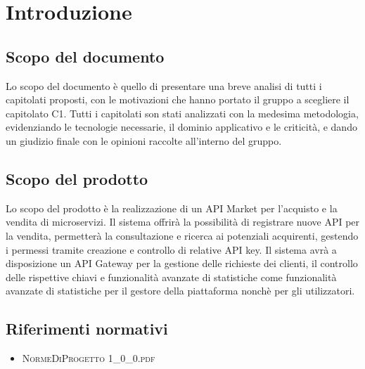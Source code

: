 \newpage
\section{Introduzione}
\subsection{Scopo del documento}
Lo scopo del documento è quello di presentare una breve analisi di tutti i capitolati proposti, con le motivazioni che hanno portato il gruppo a scegliere il capitolato C1. Tutti i capitolati son stati analizzati con la medesima metodologia,  evidenziando le tecnologie necessarie, il dominio applicativo e le criticità, e dando un giudizio finale con le opinioni raccolte all'interno del gruppo.

\subsection{Scopo del prodotto}
Lo scopo del prodotto è la realizzazione di un API Market per l'acquisto e la vendita di microservizi. Il sistema offrirà la possibilità di registrare nuove API per la vendita, permetterà la consultazione e ricerca ai potenziali acquirenti, gestendo i permessi tramite creazione e controllo di relative API key. Il sistema  avrà a disposizione un API Gateway per la gestione delle richieste dei clienti, il controllo delle rispettive chiavi e funzionalità avanzate di statistiche come funzionalità avanzate di statistiche per il gestore della piattaforma nonchè per gli utilizzatori.

\subsection{Riferimenti normativi}
\begin{itemize}
	\item \textsc{NormeDiProgetto 1\_0\_0.pdf}
\end{itemize}

